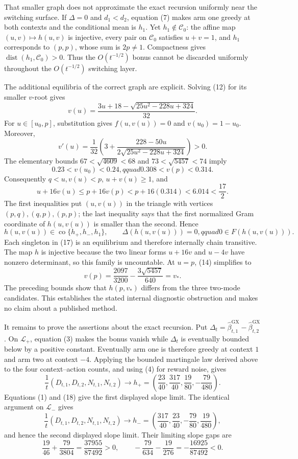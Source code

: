 That smaller graph does not approximate the exact recursion uniformly near the switching surface. If \(\Delta=0\) and \(d_1<d_2\), equation (7) makes arm one greedy at both contexts and the conditional mean is \(h_1\). Yet \(h_1\notin\mathcal C_0\): the affine map \((u,v)\mapsto h(u,v)\) is injective, every pair on \(\mathcal C_0\) satisfies \(u+v=1\), and \(h_1\) corresponds to \((p,p)\), whose sum is \(2p\ne1\). Compactness gives \(\operatorname{dist}(h_1,\mathcal C_0)>0\). Thus the \(O(t^{-1/2})\) bonus cannot be discarded uniformly throughout the \(O(t^{-1/2})\) switching layer.

The additional equilibria of the correct graph are explicit. Solving (12) for its smaller \(v\)-root gives
\[
 v(u)=\frac{3u+18-\sqrt{25u^2-228u+324}}{32}. \tag{14}
\]
For \(u\in[u_0,p]\), substitution gives \(f(u,v(u))=0\) and \(v(u_0)=1-u_0\). Moreover,
\[
 v'(u)=\frac1{32}\left(3+\frac{228-50u}{2\sqrt{25u^2-228u+324}}\right)>0. \tag{15}
\]
The elementary bounds \(67<\sqrt{4609}<68\) and \(73<\sqrt{5457}<74\) imply
\[
 0.23<v(u_0)<0.24,qquad 0.308<v(p)<0.314.
\]
Consequently \(q<u,v(u)<p\), \(u+v(u)\ge1\), and
\[
 u+16v(u)\le p+16v(p)<p+16(0.314)<6.014<\frac{17}{2}. \tag{16}
\]
The first inequalities put \((u,v(u))\) in the triangle with vertices \((p,q),(q,p),(p,p)\); the last inequality says that the first normalized Gram coordinate of \(h(u,v(u))\) is smaller than the second. Hence
\[
 h(u,v(u))\in\operatorname{co}\{h_+,h_-,h_1\},\qquad
 \Delta(h(u,v(u)))=0,qquad 0\in F(h(u,v(u))). \tag{17}
\]
Each singleton in (17) is an equilibrium and therefore internally chain transitive. The map \(h\) is injective because the two linear forms \(u+16v\) and \(u-4v\) have nonzero determinant, so this family is uncountable. At \(u=p\), (14) simplifies to
\[
 v(p)=\frac{2097}{3200}-\frac{3\sqrt{5457}}{640}=v_*.
\]
The preceding bounds show that \(h(p,v_*)\) differs from the three two-mode candidates. This establishes the stated internal diagnostic obstruction and makes no claim about a published method.

It remains to prove the assertions about the exact recursion. Put \(\Delta_t=\widehat\beta^{\mathrm{GX}}_{t,1}-\widehat\beta^{\mathrm{GX}}_{t,2}\). On \(\mathcal L_+\), equation (3) makes the bonus vanish while \(\Delta_t\) is eventually bounded below by a positive constant. Eventually arm one is therefore greedy at context \(1\) and arm two at context \(-4\). Applying the bounded martingale law derived above to the four context--action counts, and using (4) for reward noise, gives
\[
 \frac1t(D_{t,1},D_{t,2},N_{t,1},N_{t,2})
 \longrightarrow h_+=\left(\frac{23}{40},\frac{317}{40},\frac{19}{80},-\frac{79}{480}\right). \tag{18}
\]
Equations (1) and (18) give the first displayed slope limit. The identical argument on \(\mathcal L_-\) gives
\[
 \frac1t(D_{t,1},D_{t,2},N_{t,1},N_{t,2})
 \longrightarrow h_-=\left(\frac{317}{40},\frac{23}{40},-\frac{79}{80},\frac{19}{480}\right), \tag{19}
\]
and hence the second displayed slope limit. Their limiting slope gaps are
\[
 \frac{19}{46}+\frac{79}{3804}=\frac{37955}{87492}>0,
 \qquad
 -\frac{79}{634}-\frac{19}{276}=-\frac{16925}{87492}<0. \tag{20}
\]

